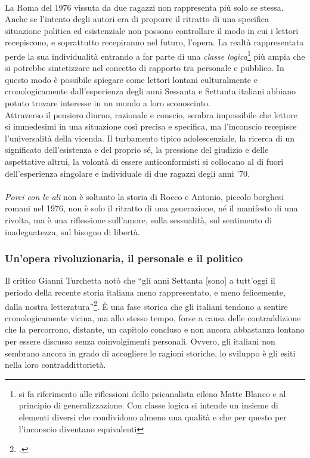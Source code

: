 \paragraph{}La Roma del 1976 vissuta da due ragazzi non rappresenta più solo se stessa.
Anche se l'intento degli autori era di proporre il ritratto di una specifica situazione politica ed esistenziale non possono controllare il modo in cui i lettori recepiscono, e soprattutto recepiranno nel futuro, l'opera.
La realtà rappresentata perde la sua individualità entrando a far parte di una \textit{classe logica}\footnote{si fa riferimento alle riflessioni dello psicanalista cileno Matte Blanco e al principio di generalizzazione. Con classe logica si intende un insieme di elementi diversi che condividono almeno una qualità e che per questo per l'inconscio diventano equivalenti} più ampia che si potrebbe sintetizzare nel concetto di rapporto tra personale e pubblico.
In questo modo è possibile spiegare come lettori lontani culturalmente e cronologicamente dall'esperienza degli anni Sessanta e Settanta italiani abbiano potuto trovare interesse in un mondo a loro sconosciuto.
\\Attraverso il pensiero diurno, razionale e conscio, sembra impossibile che lettore si immedesimi in una situazione così precisa e specifica, ma l'inconscio recepisce l'universalità della vicenda.
Il turbamento tipico adolescenziale, la ricerca di un significato dell'esistenza e del proprio sé, la pressione del giudizio e delle aspettative altrui, la volontà di essere anticonformisti  si collocano al di fuori dell'esperienza singolare e individuale di due ragazzi degli anni '70.


\paragraph{}\textit{Porci con le ali} non è soltanto  la storia di Rocco e Antonio, piccolo borghesi romani nel 1976, non è solo il ritratto di una generazione, né il manifesto di una rivolta, ma è una riflessione sull'amore, sulla sessualità, sul sentimento di inadeguatezza, sul bisogno di libertà.


\subsubsection{Un'opera rivoluzionaria, il personale e il politico}
Il critico Gianni Turchetta notò che \enquote{gli anni Settanta [sono] a tutt’oggi il periodo della recente storia italiana meno rappresentato, e meno felicemente, dalla nostra letteratura}\footcite{Giovanianni70}.
È una fase storica che gli italiani tendono a sentire cronologicamente vicina, ma allo stesso tempo, forse a causa delle contraddizione che la percorrono, distante, un capitolo concluso e non ancora abbastanza lontano per essere discusso senza coinvolgimenti personali.
Ovvero, gli italiani non sembrano ancora in grado di accogliere le ragioni storiche, lo sviluppo è gli esiti nella loro contraddittorietà.

